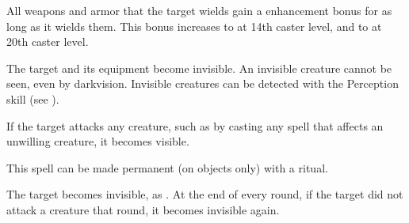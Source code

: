 \begin{spellheader}
    \spellrng{\rngclose}
    \spelldur{\durshort}
\end{spellheader}
\begin{spelleffects}
    \spelleffect All weapons and armor that the target wields gain a  enhancement bonus for as long as it wields them. This bonus increases to  at 14th caster level, and to  at 20th caster level.
\end{spelleffects}
\begin{spellfooter}

\end{spellfooter}

\begin{spellheader}
    \spellrng{\rngclose}
    \spelldur{\durshort \dismissable}
\end{spellheader}
\begin{spelleffects}
    \spelleffect The target and its equipment become invisible. An invisible creature cannot be seen, even by darkvision. Invisible creatures can be detected with the Perception skill (see ).

    If the target attacks any creature, such as by casting any spell that affects an unwilling creature, it becomes visible.
\end{spelleffects}
\begin{spellfooter}
    \spellnotes This spell can be made permanent (on objects only) with a  ritual.
\end{spellfooter}

\begin{spellheader}
    \spellrng{\rngclose}
    \spelldur{\durshort \dismissable}
\end{spellheader}
\begin{spelleffects}
    \spelleffect The target becomes invisible, as . At the end of every round, if the target did not attack a creature that round, it becomes invisible again.
\end{spelleffects}
\begin{spellfooter}

\end{spellfooter}

